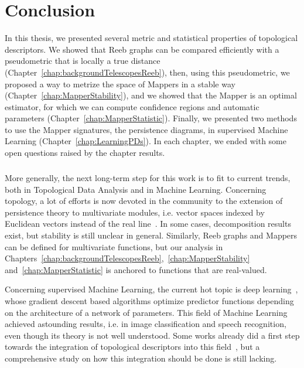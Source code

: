 \chapter{Conclusion}

In this thesis, we presented several metric and statistical properties of topological descriptors.
We showed that Reeb graphs can be compared efficiently with a pseudometric that is locally a true distance (Chapter~\ref{chap:backgroundTelescopesReeb}), 
then, using this pseudometric, we proposed a way to metrize the space of Mappers in a stable way (Chapter~\ref{chap:MapperStability}),
and we showed that the Mapper is an optimal estimator, for which we can compute confidence regions and automatic parameters (Chapter~\ref{chap:MapperStatistic}).
Finally, we presented two methods to use the Mapper signatures, the persistence diagrams, in supervised Machine Learning  (Chapter~\ref{chap:LearningPDs}).
In each chapter, we ended with some open questions raised by the chapter results.   

\paragraph*{} More generally, the next long-term step for this work is to fit to current trends, both in Topological Data Analysis and in Machine Learning.
Concerning topology, a lot of efforts is now devoted in the community to the extension of persistence theory
to multivariate modules, i.e. vector spaces indexed by Euclidean vectors instead of the real line~\cite{Cagliari11,Carlsson09c,Cochoy16,Harrington17}.
In some cases, decomposition results exist, but stability is still unclear in general. Similarly, Reeb graphs and Mappers can 
be defined for multivariate functions, but our analysis in Chapters~\ref{chap:backgroundTelescopesReeb},~\ref{chap:MapperStability} 
and~\ref{chap:MapperStatistic} is anchored to functions that are real-valued.

Concerning supervised Machine Learning, the current hot topic is deep learning~\cite{Goodfellow16}, whose gradient descent based algorithms 
optimize predictor functions depending on the architecture of a network of parameters. This field of Machine Learning achieved
astounding results, i.e. in image classification and speech recognition, even though its theory is not well understood.
Some works already did a first step towards the integration of topological descriptors into this field~\cite{Cang17,Hofer17,Liu16}, but
a comprehensive study on how this integration should be done is still lacking.